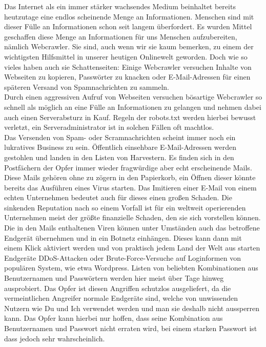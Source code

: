 Das Internet als ein immer stärker wachsendes Medium beinhaltet bereits heutzutage eine endlos scheinende Menge an Informationen. Menschen sind mit dieser Fülle an Informationen schon seit langem überfordert. Es wurden Mittel geschaffen diese Menge an Informationen für uns Menschen aufzubereiten, nämlich Webcrawler. Sie sind, auch wenn wir sie kaum bemerken, zu einem der wichtigsten Hilfsmittel in unserer heutigen Onlinewelt geworden. Doch wie so vieles haben auch sie Schattenseiten: Einige Webcrawler versuchen Inhalte von Webseiten zu kopieren, Passwörter zu knacken oder E-Mail-Adressen für einen späteren Versand von Spamnachrichten zu sammeln.\\
Durch einen aggressiven Aufruf von Webseiten versuchen bösartige Webcrawler so schnell als möglich an eine Fülle an Informationen zu gelangen und nehmen dabei auch einen Serverabsturz in Kauf. Regeln der robots.txt werden hierbei bewusst verletzt, ein Serveradministrator ist in solchen Fällen oft machtlos.\\
Das Versenden von Spam- oder Scramnachrichten scheint immer noch ein lukratives Business zu sein. Öffentlich einsehbare E-Mail-Adressen werden gestohlen und landen in den Listen von Harvestern. Es finden sich in den Postfächern der Opfer immer wieder fragwürdige aber echt erscheinende Mails. Diese Mails gehören ohne zu zögern in den Papierkorb, ein Öffnen dieser könnte bereits das Ausführen eines Virus starten. Das Imitieren einer E-Mail von einem echten Unternehmen bedeutet auch für dieses einen großen Schaden. Die sinkenden Reputation nach so einem Vorfall ist für ein weltweit operierenden Unternehmen meist der größte finanzielle Schaden, den sie sich vorstellen können.\\
Die in den Mails enthaltenen Viren können unter Umständen auch das betroffene Endgerät übernehmen und in ein Botnetz einhängen. Dieses kann dann mit einem Klick aktiviert werden und von praktisch jedem Land der Welt aus starten Endgeräte DDoS-Attacken oder Brute-Force-Versuche auf Loginformen von populären System, wie etwa Wordpress. Listen von beliebten Kombinationen aus Benutzernamen und Passwörtern werden hier meist über Tage hinweg ausprobiert. Das Opfer ist diesen Angriffen schutzlos ausgeliefert, da die vermeintlichen Angreifer normale Endgeräte sind, welche von unwissenden Nutzern wie Du und Ich verwendet werden und man sie deshalb nicht aussperren kann. Das Opfer kann hierbei nur hoffen, dass seine Kombination aus Benutzernamen und Passwort nicht erraten wird, bei einem starken Passwort ist dass jedoch sehr wahrscheinlich.